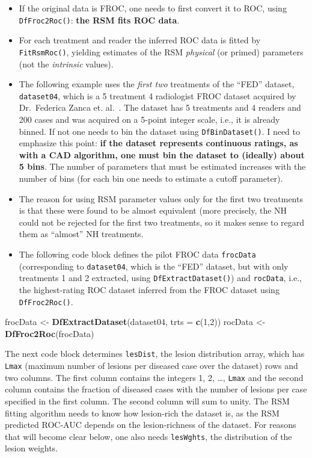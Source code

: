 \documentclass[]{book}
\newenvironment{Shaded}{\begin{snugshade}}{\end{snugshade}}
\newcommand{\DataTypeTok}[1]{\textcolor[rgb]{0.13,0.29,0.53}{#1}}
\newcommand{\DecValTok}[1]{\textcolor[rgb]{0.00,0.00,0.81}{#1}}
\newcommand{\KeywordTok}[1]{\textcolor[rgb]{0.13,0.29,0.53}{\textbf{#1}}}
\newcommand{\NormalTok}[1]{#1}
\newcommand{\StringTok}[1]{\textcolor[rgb]{0.31,0.60,0.02}{#1}}
\begin{document}
\begin{itemize}
\item
  If the original data is FROC, one needs to first convert it to ROC, using \texttt{DfFroc2Roc()}: \textbf{the RSM fits ROC data}.
\item
  For each treatment and reader the inferred ROC data is fitted by \texttt{FitRsmRoc()}, yielding estimates of the RSM \emph{physical} (or primed) parameters (not the \emph{intrinsic} values).
\item
  The following example uses the \emph{first two} treatments of the ``FED'' dataset, \texttt{dataset04}, which is a 5 treatment 4 radiologist FROC dataset acquired by Dr.~Federica Zanca et. al.~\citep{RN1882}. The dataset has 5 treatments and 4 readers and 200 cases and was acquired on a 5-point integer scale, i.e., it is already binned. If not one needs to bin the dataset using \texttt{DfBinDataset()}. I need to emphasize this point: \textbf{if the dataset represents continuous ratings, as with a CAD algorithm, one must bin the dataset to (ideally) about 5 bins}. The number of parameters that must be estimated increases with the number of bins (for each bin one needs to estimate a cutoff parameter).
\item
  The reason for using RSM parameter values only for the first two treatments is that these were found \citep{RN1882} to be almost equivalent (more precisely, the NH could not be rejected for the first two treatments, so it makes sense to regard them as ``almost'' NH treatments.
\item
  The following code block defines the pilot FROC data \texttt{frocData} (corresponding to \texttt{dataset04}, which is the ``FED'' dataset, but with only treatments 1 and 2 extracted, using \texttt{DfExtractDataset()}) and \texttt{rocData}, i.e., the highest-rating ROC dataset inferred from the FROC dataset using \texttt{DfFroc2Roc()}.
\end{itemize}

\begin{Shaded}
\begin{Highlighting}[]
\NormalTok{frocData <-}\StringTok{ }\KeywordTok{DfExtractDataset}\NormalTok{(dataset04, }\DataTypeTok{trts =} \KeywordTok{c}\NormalTok{(}\DecValTok{1}\NormalTok{,}\DecValTok{2}\NormalTok{))}
\NormalTok{rocData <-}\StringTok{ }\KeywordTok{DfFroc2Roc}\NormalTok{(frocData)}
\end{Highlighting}
\end{Shaded}

The next code block determines \texttt{lesDist}, the lesion distribution array, which has \texttt{Lmax} (maximum number of lesions per diseased case over the dataset) rows and two columns. The first column contains the integers 1, 2, \ldots{}, \texttt{Lmax} and the second column contains the fraction of diseased cases with the number of lesions per case specified in the first column. The second column will sum to unity. The RSM fitting algorithm needs to know how lesion-rich the dataset is, as the RSM predicted ROC-AUC depends on the lesion-richness of the dataset. For reasons that will become clear below, one also needs \texttt{lesWghts}, the distribution of the lesion weights.
\end{document}
